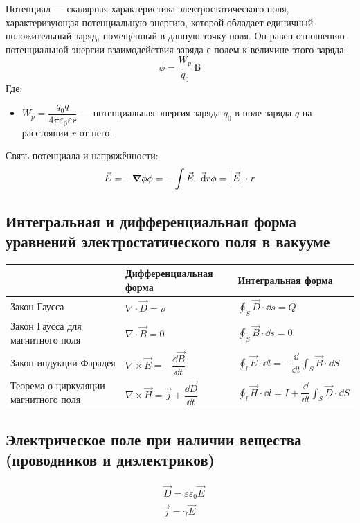 \documentclass[12pt]{report}
\begin{document}
Потенциал --- скалярная характеристика электростатического поля, характеризующая потенциальную энергию, которой обладает единичный положительный заряд, помещённый в данную точку поля. Он равен отношению потенциальной энергии взаимодействия заряда с полем к величине этого заряда:
\[
    \phi = \dfrac{W_p}{q_0} \ \text{В}
\]
Где:
\begin{itemize}
    \item $W_p = \dfrac{q_0q}{4\pi\varepsilon_0\varepsilon r}$ --- потенциальная энергия заряда $q_0$ в поле заряда $q$ на расстоянии $r$ от него.
\end{itemize}

Связь потенциала и напряжённости:
\[
    \vec E = - \grad \phi \\ \phi = - \int \vec E \cdot \vec \dd{r} \\ \phi = \abs{\vec{E}} \cdot r
\]
\subsection{Интегральная и дифференциальная форма уравнений электростатического поля в вакууме}
\begin{tabular}{|l|l|l|}
    \hline
                                         & Дифференциальная форма                                        & Интегральная форма                                                                            \\
    \hline
    Закон Гаусса                         & $\displaystyle \nabla \cdot \vec D = \rho$                    & $\displaystyle \oint_S \vec D \cdot \dd s = Q$                                                \\
    \hline
    Закон Гаусса для магнитного поля     & $\nabla \cdot \vec B = 0$                                     & $\displaystyle \oint_S \vec B \cdot \dd s = 0$                                                \\
    \hline
    Закон индукции Фарадея               & $\nabla \times \vec E = -\dfrac{\dd{\vec B}}{\dd{t}}$         & $\displaystyle \oint_l \vec E \cdot \dd l = -\dfrac{\dd}{\dd{t}}\int_S \vec B \cdot \dd S$    \\
    \hline
    Теорема о циркуляции магнитного поля & $\nabla \times \vec H = \vec j + \dfrac{\dd{\vec D}}{\dd{t}}$ & $\displaystyle \oint_l \vec H \cdot \dd l = I + \dfrac{\dd}{\dd t} \int_S \vec D \cdot \dd S$ \\
    \hline
\end{tabular}

\subsection{Электрическое поле при наличии вещества (проводников и диэлектриков)}
\begin{align*}
     & \vec D = \varepsilon \varepsilon_0 \vec E \\
     & \vec j = \gamma \vec E                    \\
\end{align*}
\end{document}

